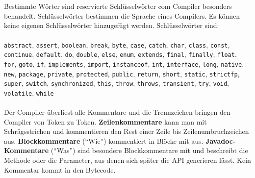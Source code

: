 \\\\
Bestimmte Wörter sind reservierte Schlüsselwörter com Compiler besonders behandelt. Schlüsselwörter bestimmen die Sprache eines Compilers. Es können keine eigenen Schlüsselwörter hinzugefügt werden. Schlüsselwörter sind:
\\\\
\texttt{abstract}, \texttt{assert}, \texttt{boolean}, \texttt{break}, \texttt{byte}, \texttt{case}, \texttt{catch}, \texttt{char}, \texttt{class}, \texttt{const}, \texttt{continue}, \texttt{default}, \texttt{do}, \texttt{double}, \texttt{else}, \texttt{enum}, \texttt{extends}, \texttt{final}, \texttt{finally}, \texttt{float}, \texttt{for}, \texttt{goto}, \texttt{if}, \texttt{implements}, \texttt{import}, \texttt{instanceof}, \texttt{int}, \texttt{interface}, \texttt{long}, \texttt{native}, \texttt{new}, \texttt{package}, \texttt{private}, \texttt{protected}, \texttt{public}, \texttt{return}, \texttt{short}, \texttt{static}, \texttt{strictfp}, \texttt{super}, \texttt{switch}, \texttt{synchronized}, \texttt{this}, \texttt{throw}, \texttt{throws}, \texttt{transient}, \texttt{try}, \texttt{void}, \texttt{volatile}, \texttt{while}
\\\\
Der Compiler überliest alle Kommentare und die Trennzeichen bringen den Compiler von Token zu Token. \textbf{Zeilenkommentare} kann man mit Schrägsstrichen \boxed{\textbf{\texttt{//}}} und kommentieren den Rest einer Zeile bis Zeilenumbruchzeichen aus. \textbf{Blockkommentare} (``Wie'') kommentiert in Blöcke mit \boxed{\textbf{\texttt{/* */}}} aus. \textbf{Javadoc-Kommentare} (``Was'') sind besondere Blockkommentare mit \boxed{\textbf{\texttt{/** */}}} und beschreibt die Methode oder die Parameter, aus denen sich später die API generieren lässt. Kein Kommentar kommt in den Bytecode.
